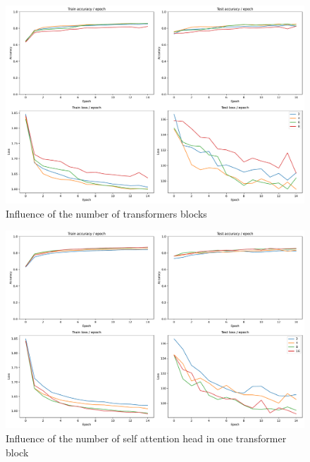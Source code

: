 \begin{figure}[H]
    \centering
    \includegraphics*[width=\textwidth]{figs/Transformers/fashion-MNIST/nb_block_influence.pdf}
    \caption{Influence of the number of transformers blocks}
    \label{fig:nb_block_influence}
\end{figure}

\begin{figure}[H]
    \centering
    \includegraphics*[width=\textwidth]{figs/Transformers/fashion-MNIST/num_heads_influence.pdf}
    \caption{Influence of the number of self attention head in one transformer block }
    \label{fig:num_heads_influence}
\end{figure}

